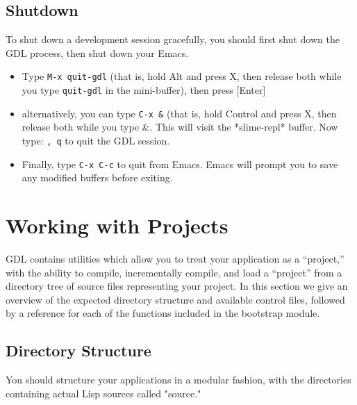 \documentclass [11pt]{book}
\begin{document}
\subsection{Shutdown}

\label{subsec:shutdown}

 To shut down a development session gracefully, you should first shut down the GDL process,
then shut down your Emacs.

\begin{itemize}

\item Type \texttt{M-x quit-gdl} (that is, hold Alt and press X, then release both while you type \texttt{quit-gdl} in the mini-buffer), then press [Enter]

\item alternatively, you can type \texttt{C-x \&} (that is, hold Control and press X, then release both while you type \&. 
This will visit the *slime-repl* buffer. Now type: 
\texttt{, q} to quit the GDL session.

\item Finally, type \texttt{C-x C-c} to quit from Emacs. Emacs will prompt you to save any
	   modified buffers before exiting.

\end{itemize}



\section{Working with Projects}

\label{sec:workingwithprojects}

GDL contains utilities which allow you to treat your
application as a ``project,'' with the ability to compile,
incrementally compile, and load a ``project'' from a directory tree of
source files representing your project. In this section we give an
overview of the expected directory structure and available control
files, followed by a reference for each of the functions included in
the bootstrap module.

\subsection{Directory Structure}

\label{subsec:directorystructure}



You should structure your applications in a modular fashion, with the
directories containing actual Lisp sources called "source."
\end{document}
